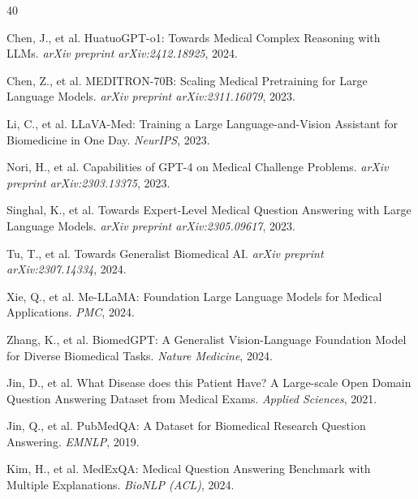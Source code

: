 \documentclass{article}
\begin{document}
\begin{thebibliography}{40}


Chen, J., et al.
\newblock HuatuoGPT-o1: Towards Medical Complex Reasoning with LLMs.
\newblock \emph{arXiv preprint arXiv:2412.18925}, 2024.

Chen, Z., et al.
\newblock MEDITRON-70B: Scaling Medical Pretraining for Large Language Models.
\newblock \emph{arXiv preprint arXiv:2311.16079}, 2023.

Li, C., et al.
\newblock LLaVA-Med: Training a Large Language-and-Vision Assistant for Biomedicine in One Day.
\newblock \emph{NeurIPS}, 2023.

Nori, H., et al.
\newblock Capabilities of GPT-4 on Medical Challenge Problems.
\newblock \emph{arXiv preprint arXiv:2303.13375}, 2023.

Singhal, K., et al.
\newblock Towards Expert-Level Medical Question Answering with Large Language Models.
\newblock \emph{arXiv preprint arXiv:2305.09617}, 2023.

Tu, T., et al.
\newblock Towards Generalist Biomedical AI.
\newblock \emph{arXiv preprint arXiv:2307.14334}, 2024.

Xie, Q., et al.
\newblock Me-LLaMA: Foundation Large Language Models for Medical Applications.
\newblock \emph{PMC}, 2024.

Zhang, K., et al.
\newblock BiomedGPT: A Generalist Vision-Language Foundation Model for Diverse Biomedical Tasks.
\newblock \emph{Nature Medicine}, 2024.


Jin, D., et al.
\newblock What Disease does this Patient Have? A Large-scale Open Domain Question Answering Dataset from Medical Exams.
\newblock \emph{Applied Sciences}, 2021.

Jin, Q., et al.
\newblock PubMedQA: A Dataset for Biomedical Research Question Answering.
\newblock \emph{EMNLP}, 2019.

Kim, H., et al.
\newblock MedExQA: Medical Question Answering Benchmark with Multiple Explanations.
\newblock \emph{BioNLP (ACL)}, 2024.


\end{thebibliography}
\end{document}
